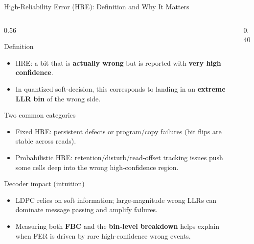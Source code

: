\begin{frame}{High-Reliability Error (HRE): Definition and Why It Matters}
\vspace{-0.2cm}
\begin{columns}
  \begin{column}{0.56\textwidth}
    \begin{block}{Definition}
      \begin{itemize}
        \item HRE: a bit that is \textbf{actually wrong} but is reported with \textbf{very high confidence}.
        \item In quantized soft-decision, this corresponds to landing in an \textbf{extreme LLR bin} of the wrong side.
      \end{itemize}
    \end{block}
    \begin{block}{Two common categories}
      \begin{itemize}
        \item Fixed HRE: persistent defects or program/copy failures (bit flips are stable across reads).
        \item Probabilistic HRE: retention/disturb/read-offset tracking issues push some cells deep into the wrong high-confidence region.
      \end{itemize}
    \end{block}
    \begin{block}{Decoder impact (intuition)}
      \begin{itemize}
        \item LDPC relies on soft information; large-magnitude wrong LLRs can dominate message passing and amplify failures.
        \item Measuring both \textbf{FBC} and the \textbf{bin-level breakdown} helps explain when FER is driven by rare high-confidence wrong events.
      \end{itemize}
    \end{block}
  \end{column}
  \begin{column}{0.40\textwidth}
    \centering
  \end{column}
\end{columns}
\end{frame}
